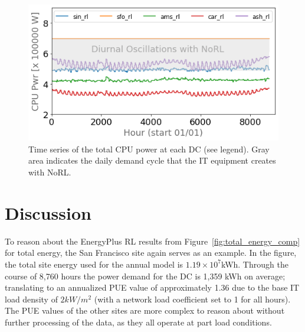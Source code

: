 \begin{figure}
  \centering
  \includegraphics[scale=0.45]{img/cpu_comps.png}
  \caption{Time series of the total CPU power at each DC (see legend). Gray area indicates the daily demand cycle that the IT equipment creates with NoRL.}
  \label{fig:cpu_comps}
  \end{figure}




\section{Discussion}
To reason about the EnergyPlus RL results from Figure~\ref{fig:total_energy_comp} for total energy, the San Francisco site again serves as an example. In the figure, the total site energy used for the annual model is $1.19 \times 10^7$kWh. Through the course of 8,760 hours the power demand for the DC is 1,359 kWh on average; translating to an annualized PUE value of approximately 1.36 due to the base IT load density of $2 kW/m^2$ (with a network load coefficient set to 1 for all hours). The PUE values of the other sites are more complex to reason about without further processing of the data, as they all operate at part load conditions.

